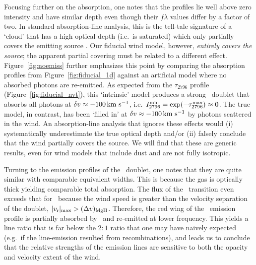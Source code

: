 \documentclass[]{emulateapj}
\begin{document}
Focusing further on the  absorption, one notes that the profiles lie
well above zero intensity and have similar depth even though their $f\lambda$
values differ by a factor of two.  In standard absorption-line
analysis, this is 
the tell-tale signature of a `cloud' that has a high optical depth (i.e.\
is saturated) which only partially covers the emitting source
\citep[e.g.][]{rvs05a,hkp+10}.  Our fiducial wind model, however, 
{\it entirely covers the source}; the apparent partial covering must
be related to a different effect.
Figure~\ref{fig:noemiss} further emphasizes this point by comparing the 
absorption profiles from Figure~\ref{fig:fiducial_1d} against an
artificial model where no absorbed photons are 
re-emitted.   As expected from the
$\tau_{2796}$ profile (Figure~\ref{fig:fiducial_nvt}), this
`intrinsic' model
produces a strong \mgiid\ doublet that absorbs all photons at
$\delta v \approx -100 \, {\rm km~s^{-1}}$, i.e.\ $I_{2796}^{\rm min} = \exp(-\tau^{\rm
  max}_{2796}) \approx 0$.
The true model, in contrast, has been `filled in' at $\delta v \approx -100
\, {\rm km~s^{-1}}$ by photons scattered in the wind.  An
absorption-line analysis that ignores these effects
would (i) systematically underestimate the true optical
depth and/or (ii) falsely conclude that the wind partially covers the
source.  We will find that these are
generic results, even for wind models that include
dust and are not fully isotropic.

Turning to the emission profiles of the \mgiid\ doublet, one notes
that they are quite similar with comparable equivalent widths.
This is because the gas is optically
thick yielding comparable total absorption. The
flux of the \mgiib\ transition even exceeds that for \mgiia\ 
because the wind speed is greater than the velocity separation
of the doublet, $|v_{\rm r}|_{\rm max} > (\Delta v)_{\rm MgII}$.
Therefore, the red wing of the
\mgiia\ emission profile is partially absorbed by \mgiib\ and
re-emitted at lower frequency.
This yields a
line ratio that is far below the $2:1$ ratio that one may have naively
expected (e.g.\ if the line-emission resulted from recombinations),
and leads us to conclude that the relative 
strengths of the emission lines are sensitive to both the opacity and
velocity extent of the wind. 
\end{document}
